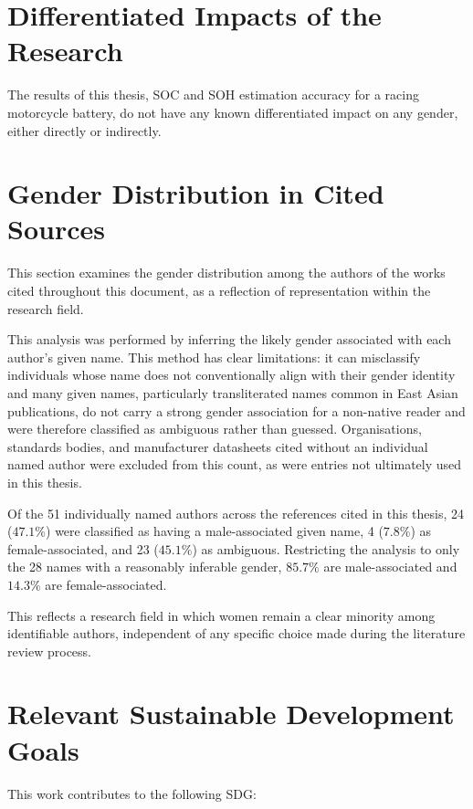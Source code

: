 \section{Differentiated Impacts of the Research}

The results of this thesis, \ac{SOC} and \ac{SOH} estimation 
accuracy for a racing motorcycle battery, do not have any known differentiated 
impact on any gender, either directly or indirectly.

\section{Gender Distribution in Cited Sources}
This section examines the gender distribution 
among the authors of the works cited throughout this document, as a reflection of 
representation within the research field.

This analysis was performed by inferring the likely gender associated with each 
author's given name. This method has clear limitations: it can misclassify 
individuals whose name does not conventionally align with their gender identity 
and many given names, particularly transliterated names common in East Asian 
publications, do not carry a strong gender association for a non-native reader 
and were therefore classified as ambiguous rather than guessed. Organisations, 
standards bodies, and manufacturer datasheets cited without an individual named 
author were excluded from this count, as were entries not ultimately used in this 
thesis.

Of the 51 individually named authors across the references cited in this thesis, 
24 ($47.1\%$) were classified as having a male-associated given name, 4 ($7.8\%$) 
as female-associated, and 23 ($45.1\%$) as ambiguous. Restricting the analysis to 
only the 28 names with a reasonably inferable gender, $85.7\%$ are male-associated 
and $14.3\%$ are female-associated.

This reflects a 
research field in which women remain a clear minority among identifiable authors, 
independent of any specific choice made during the literature review process.

\section{Relevant Sustainable Development Goals}

This work contributes to the following \ac{SDG}:

